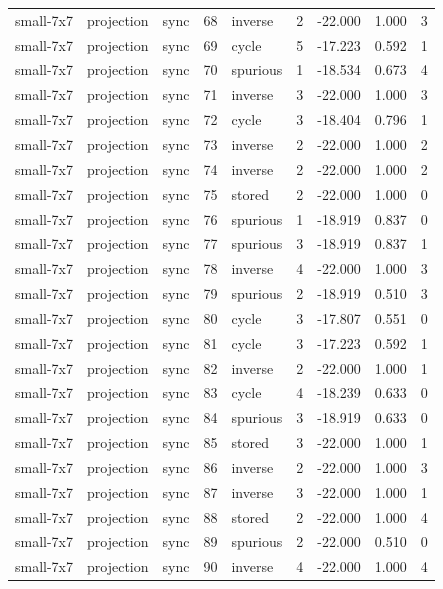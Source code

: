 \begin{tabular}{lllrlrrrr}
small-7x7 & projection & sync & 68 & inverse & 2 & -22.000 & 1.000 & 3 \\
small-7x7 & projection & sync & 69 & cycle & 5 & -17.223 & 0.592 & 1 \\
small-7x7 & projection & sync & 70 & spurious & 1 & -18.534 & 0.673 & 4 \\
small-7x7 & projection & sync & 71 & inverse & 3 & -22.000 & 1.000 & 3 \\
small-7x7 & projection & sync & 72 & cycle & 3 & -18.404 & 0.796 & 1 \\
small-7x7 & projection & sync & 73 & inverse & 2 & -22.000 & 1.000 & 2 \\
small-7x7 & projection & sync & 74 & inverse & 2 & -22.000 & 1.000 & 2 \\
small-7x7 & projection & sync & 75 & stored & 2 & -22.000 & 1.000 & 0 \\
small-7x7 & projection & sync & 76 & spurious & 1 & -18.919 & 0.837 & 0 \\
small-7x7 & projection & sync & 77 & spurious & 3 & -18.919 & 0.837 & 1 \\
small-7x7 & projection & sync & 78 & inverse & 4 & -22.000 & 1.000 & 3 \\
small-7x7 & projection & sync & 79 & spurious & 2 & -18.919 & 0.510 & 3 \\
small-7x7 & projection & sync & 80 & cycle & 3 & -17.807 & 0.551 & 0 \\
small-7x7 & projection & sync & 81 & cycle & 3 & -17.223 & 0.592 & 1 \\
small-7x7 & projection & sync & 82 & inverse & 2 & -22.000 & 1.000 & 1 \\
small-7x7 & projection & sync & 83 & cycle & 4 & -18.239 & 0.633 & 0 \\
small-7x7 & projection & sync & 84 & spurious & 3 & -18.919 & 0.633 & 0 \\
small-7x7 & projection & sync & 85 & stored & 3 & -22.000 & 1.000 & 1 \\
small-7x7 & projection & sync & 86 & inverse & 2 & -22.000 & 1.000 & 3 \\
small-7x7 & projection & sync & 87 & inverse & 3 & -22.000 & 1.000 & 1 \\
small-7x7 & projection & sync & 88 & stored & 2 & -22.000 & 1.000 & 4 \\
small-7x7 & projection & sync & 89 & spurious & 2 & -22.000 & 0.510 & 0 \\
small-7x7 & projection & sync & 90 & inverse & 4 & -22.000 & 1.000 & 4 \\

\end{tabular}
